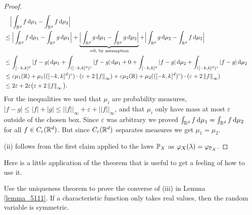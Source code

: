 \begin{proof}[Proof]
			\begin{align*}
				&\quad\Big\lvert \int_{\mathbb{R}^d} f \dint \mu_1 - \int_{\mathbb{R}^d} f \dint \mu_2 \Big\rvert \\
				&\leq \Big\lvert \int_{\mathbb{R}^d} f \dint \mu_1 - \int_{\mathbb{R}^d} g \dint \mu_1 \Big\rvert + \underbrace{ \Big\lvert \int_{\mathbb{R}^d} g \dint \mu_1 - \int_{\mathbb{R}^d} g \dint \mu_2 \Big\rvert }_{= 0, \text{ by assumption}} + \Big\lvert \int_{\mathbb{R}^d} g \dint \mu_2 - \int_{\mathbb{R}^d} f \dint \mu_2 \Big\rvert  \\
&\leq \int_{[-k,k]^d}|f-g|\dint \mu_1+ \int_{([-k,k]^d)^c}|f-g|\dint \mu_1+0
+ \int_{[-k,k]^d}|f-g|\dint \mu_2 + \int_{([-k,k]^d)^c}|f-g|\dint \mu_2\\
				& \leq \varepsilon \mu_1 (\R)  + \mu_1 ( ([-k,k]^d)^c ) \cdot ( \varepsilon + 2\left\Vert f \right\Vert_{\infty})  +   \varepsilon \mu_2 (\R)
				 + \mu_2 ( ([-k,k]^d)^c ) \cdot ( \varepsilon + 2\left\Vert f \right\Vert_{\infty}) \\
				&\leq 2 \varepsilon + 2 \varepsilon \big( \varepsilon + 2\left\Vert f \right\Vert_{\infty} \big).
			\end{align*}
			For the inequalities we used that $\mu_i$ are probability measures, $|f-g|\leq |f|+|g|\leq ||f||_\infty+\varepsilon +||f||_\infty$, and that $\mu_i$ only have mass at most $\varepsilon$ outside of the chosen box. Since $\varepsilon$ was arbitrary we proved $\int_{\R^d} f \dint \mu_1 = \int_{\R^d} f \dint \mu_2$ for all $f\in C_c(\R^d)$. But since $C_c(\R^d)$ separates measures we get $\mu_1=\mu_2$.			
			\smallskip

			(ii) follows from the first claim applied to the laws $\P_X$ as $\varphi_X(\lambda)=\varphi_{\P_X}$.
		 \end{proof}
Here is a little application of the theorem that is useful to get a feeling of how to use it.
\begin{luebung}
	Use the uniqueness theorem to prove the converse of (iii) in Lemma \ref{lemma_5111}. If a characteristic function only takes real values, then the random variable is symmetric.
\end{luebung}

